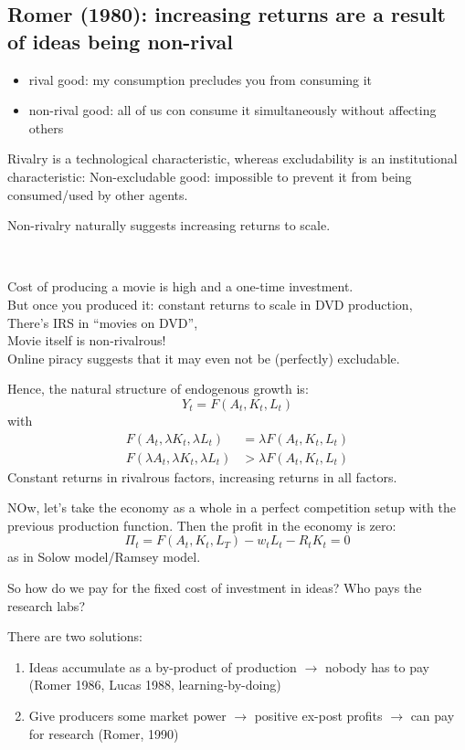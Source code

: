 \subsection{Romer (1980): increasing returns are a result of ideas being non-rival}
\begin{itemize}
    \item rival good: my consumption precludes you from consuming it
    \item non-rival good: all of us con consume it simultaneously without
    affecting others
\end{itemize}

Rivalry is a technological characteristic, whereas excludability is an
institutional characteristic: Non-excludable good: impossible to prevent it from being
consumed/used by other agents.

Non-rivalry naturally suggests increasing returns to scale.
\begin{eg}
    \

    Cost of producing a movie is high and a one-time investment. \\
    But once you produced it: constant returns to scale in DVD production,\\
    There's IRS in “movies on DVD”,\\
    Movie itself is non-rivalrous!\\
    Online piracy suggests that it may even not be (perfectly) excludable.
\end{eg}
Hence, the natural structure of endogenous growth is:
\[Y_t = F(A_t, K_t, L_t)\]
with
\begin{align*}
    F(A_t, \lambda K_t, \lambda L_t) &= \lambda F(A_t, K_t, L_t) \\
    F(\lambda A_t, \lambda K_t, \lambda L_t) &> \lambda F(A_t, K_t, L_t)
\end{align*}
Constant returns in rivalrous factors, increasing returns in all factors.

NOw, let's take the economy as a whole in a perfect competition setup with the
previous production function. Then the profit in the economy is zero:
\[\Pi _t = F(A_t, K_t, L_T) - w_t L_t - R_t K_t = 0 \]
as in Solow model/Ramsey model.

So how do we pay for the fixed cost of investment in ideas? Who
pays the research labs?

There are two solutions:

\begin{enumerate}
    \item Ideas accumulate as a by-product of production $\rightarrow$ nobody has to pay
    (Romer 1986, Lucas 1988, learning-by-doing)
    \item Give producers some market power $\rightarrow$ positive ex-post profits $\rightarrow$ can
    pay for research (Romer, 1990)
\end{enumerate}

